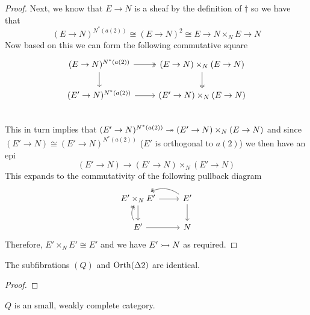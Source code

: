 \begin{proof}
  Next, we know that $E \to N$ is a sheaf by the definition of
  $\dagger$ so we have that
  \[
    (E \to N)^{N^*(a(2))} \cong (E \to N)^2 \cong E \to N \times_N E \to N
  \]
  Now based on this we can form the following commutative square
  \[
    \begin{tikzcd}
      (E \to N)^{N^*(a(2))} \ar[r, twoheadrightarrow] \ar[d] & (E \to N) \times_N (E \to N) \ar[d, twoheadrightarrow]\\
      (E' \to N)^{N^*(a(2))} \ar[r] & (E' \to N) \times_N (E \to N)\\
    \end{tikzcd}
  \]
  This in turn implies that
  $(E' \to N)^{N^*(a(2))} \twoheadrightarrow (E' \to N) \times_N (E \to N)$ and
  since $(E' \to N) \cong (E' \to N)^{N^*(a(2))}$ ($E'$ is orthogonal
  to $a(2)$) we then have an epi
  \[
    (E' \to N) \to (E' \to N) \times_N (E' \to N)
  \]
  This expands to the commutativity of the following pullback diagram
  \[
    \begin{tikzcd}
      E' \times_N E' \ar[d] \ar[r] & E' \ar[d] \ar[l, bend right, twoheadrightarrow] \\
      \ar[u, bend left, twoheadrightarrow] E' \ar[r] & N
    \end{tikzcd}
  \]
  Therefore, $E' \times_N E' \cong E'$ and we have $E' \rightarrowtail N$ as
  required.
\end{proof}
\begin{thm}\label{defn:orth:seporth}
  The subfibrations $(Q)$ and $\operatorname{Orth}(\Delta 2)$ are identical.
\end{thm}
\begin{proof}
\end{proof}
\begin{cor}
  $Q$ is an small, weakly complete category.
\end{cor}


